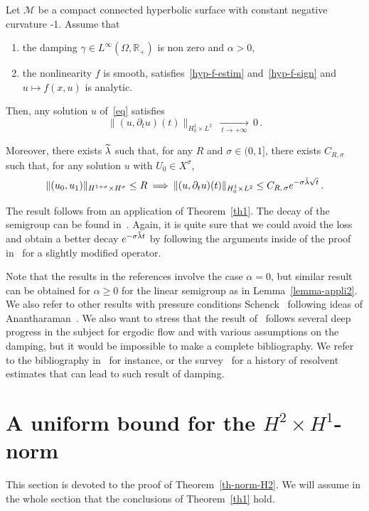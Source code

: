 \documentclass[AHL,Unicode,longabstracts]{cedram}
\newcommand{\RR}{\mathbb{R}}
\newcommand*{\alphenumi}{\renewcommand*{\theenumi}{\alph{enumi}}}
\let\oldtilde\tilde
\renewcommand*{\tilde}[1]{\mathchoice{\widetilde{#1}}{\widetilde{#1}}{\oldtilde{#1}}{\oldtilde{#1}}}\let\oldexists\exists
\renewcommand*{\exists}{\mathrel{\oldexists}}
\begin{document}
\begin{theo}\label{th-appli5}
Let $\mathcal{M}$ be a compact connected hyperbolic surface with constant negative curvature -1. Assume that
\begin{enumerate}\alphenumi
\item \label{listtheo12.1.1}the damping $\gamma\in L^\infty(\Omega,\RR_+)$ is non zero and $\alpha>0$,
\item \label{listtheo12.1.2}the nonlinearity $f$ is smooth, satisfies~\eqref{hyp-f-estim} and~\eqref{hyp-f-sign} and $u\mapsto f(x,u)$ is analytic.
\end{enumerate}

Then, any solution $u$ of~\eqref{eq} satisfies
\[
\|(u,\partial_t u)(t)\|_{H^1_0\times L^2}\,\xrightarrow[\:t\longrightarrow
+\infty\:]{}\,0\,.
\]

Moreover, there exists $\tilde\lambda$ such that, for any $R$ and $\sigma\in (0,1]$, there exists $C_{R,\sigma}$ such that, for any solution $u$ with $U_0\in X^\sigma$,
\[
\|(u_0,u_1)\|_{H^{1+\sigma}\times H^\sigma}\leq
R\:\Longrightarrow\:\|(u,\partial_t u)(t)\|_{H^1_0\times L^2} \leq
C_{R,\,\sigma}e^{-\sigma\tilde \lambda\sqrt{t}}\,.
\]
\end{theo}

The result follows from an application of Theorem~\ref{th1}. The decay of the semigroup can be found in~\cite{Lin}. Again, it is quite sure that we could avoid the loss and obtain a better decay $e^{-\sigma\tilde \lambda t}$ by following the arguments inside of the proof in~\cite{Lin} for a slightly modified operator.

Note that the results in the references involve the case $\alpha=0$, but similar result can be obtained for $\alpha\geq 0$ for the linear semigroup as in Lemma~\ref{lemma-appli2}. We also refer to other results with pressure conditions Schenck~\cite{Schenckpressure} following ideas of Anantharaman~\cite{Anant}. We also want to stress that the result of~\cite{Lin} follows several deep progress in the subject for ergodic flow and with various assumptions on the damping, but it would be impossible to make a complete bibliography. We refer to the bibliography in~\cite{Lin} for instance, or the survey~\cite{NonenmacherICM} for a history of resolvent estimates that can lead to such result of damping.



\section{A uniform bound for the \texorpdfstring{$H^2\times H^1$}{H2 x H1}-norm}\label{section-th-norm-H2}
This section is devoted to the proof of Theorem~\ref{th-norm-H2}. We will assume in the whole section that the conclusions of Theorem~\ref{th1} hold.
\end{document}
